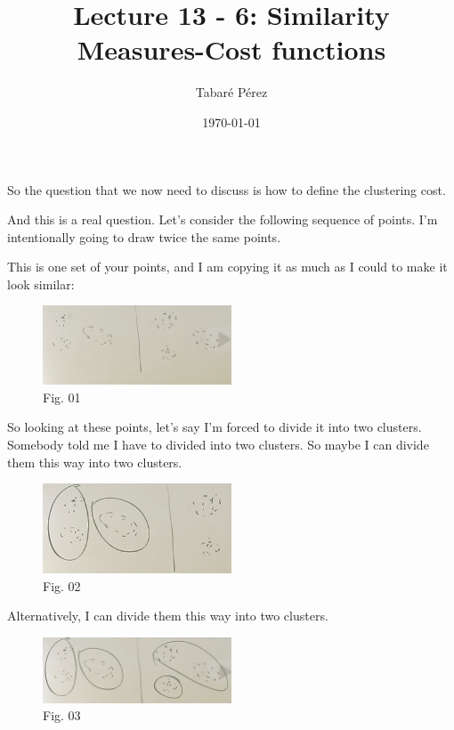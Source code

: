 \documentclass[a4paper, 12pt]{article}
\author{Tabaré Pérez}
\date{\today}
\title{Lecture 13 - 6: Similarity Measures-Cost functions}
\begin{document}
\maketitle
So the question that we now need to discuss is how to define the clustering
cost.

And this is a real question. Let's consider the following sequence of points.
I'm intentionally going to draw twice the same points.

This is one set of your points, and I am copying it as much as I could to make it
look similar:

\begin{figure}[H]
\centering
\includegraphics[width=0.5\textwidth]{./pic/04-06-fig-01.png}
\caption{\label{fig:org3930fde}Fig. 01}
\end{figure}

So looking at these points, let's say I'm forced to divide it into two clusters.
Somebody told me I have to divided into two clusters. So maybe I can divide them
this way into two clusters.

\begin{figure}[H]
\centering
\includegraphics[width=0.5\textwidth]{./pic/04-06-fig-02.png}
\caption{\label{fig:orgf38c0b3}Fig. 02}
\end{figure}

Alternatively, I can divide them this way into two clusters.

\begin{figure}[H]
\centering
\includegraphics[width=0.5\textwidth]{./pic/04-06-fig-03.png}
\caption{\label{fig:org205916d}Fig. 03}
\end{figure}
\end{document}
